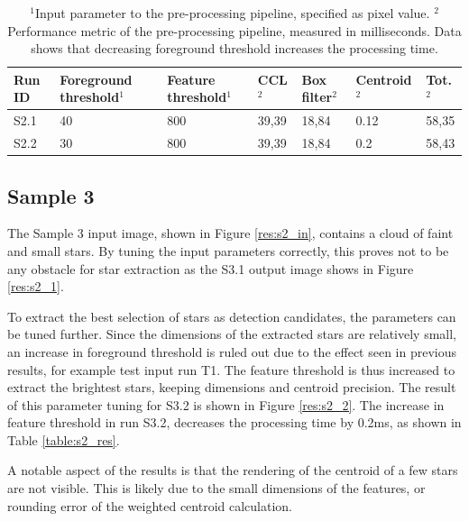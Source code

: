 \documentclass[12pt]{report}
\begin{document}
\begin{table}[!h]
    \centering
    \begin{tabular}{|p{0.8cm}|p{2.5cm}|p{2cm}||p{1.25cm}|p{1.25cm}|p{1.9cm}|p{1cm}|}
        \hline
        \textbf{Run ID}&\textbf{Foreground threshold$^{1}$}&\textbf{Feature threshold$^{1}$}&\textbf{CCL$^{2}$}&\textbf{Box filter$^{2}$}&\textbf{Centroid$^{2}$}&\textbf{Tot.$^{2}$}\\
        \hline
        \hline
        S2.1&40&800&39,39&18,84&0.12&58,35\\
        \hline
        S2.2&30&800&39,39&18,84&0.2&58,43\\
        \hline
    \end{tabular}
    \caption{$^{1}$Input parameter to the pre-processing pipeline, specified as pixel value. $^{2}$Performance metric of the pre-processing pipeline, measured in milliseconds. Data shows that decreasing foreground threshold increases the processing time.}
    \label{table:s1_res}
\end{table}

\subsection*{Sample 3}
The Sample 3 input image, shown in Figure \ref{res:s2_in}, contains a cloud of faint and small stars. By tuning the input parameters correctly, this proves not to be any obstacle for star extraction as the S3.1 output image shows in Figure \ref{res:s2_1}.
\par
To extract the best selection of stars as detection candidates, the parameters can be tuned further. Since the dimensions of the extracted stars are relatively small, an increase in foreground threshold is ruled out due to the effect seen in previous results, for example test input run T1. The feature threshold is thus increased to extract the brightest stars, keeping dimensions and centroid precision. The result of this parameter tuning for S3.2 is shown in Figure \ref{res:s2_2}. The increase in feature threshold in run S3.2, decreases the processing time by 0.2ms, as shown in Table \ref{table:s2_res}.
\par
A notable aspect of the results is that the rendering of the centroid of a few stars are not visible. This is likely due to the small dimensions of the features, or rounding error of the weighted centroid calculation.
\end{document}

